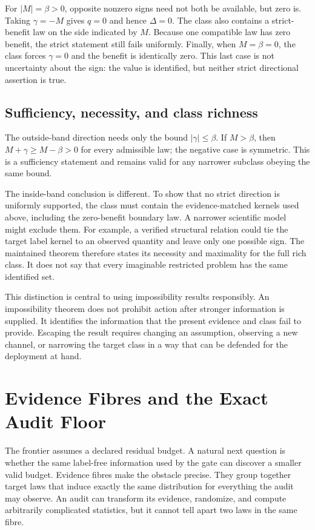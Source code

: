 For $|M|=\beta>0$, opposite nonzero signs need not both be available, but zero is.  Taking
$\gamma=-M$ gives $q=0$ and hence $\Delta=0$.  The class also contains a strict-benefit law on the
side indicated by $M$.  Because one compatible law has zero benefit, the strict statement still
fails uniformly.  Finally, when $M=\beta=0$, the class forces $\gamma=0$ and the benefit is
identically zero.  This last case is not uncertainty about the sign: the value is identified, but
neither strict directional assertion is true.

\subsection{Sufficiency, necessity, and class richness}
\label{fr:subsec-richness}

The outside-band direction needs only the bound $|\gamma|\le\beta$.  If $M>\beta$, then
$M+\gamma\ge M-\beta>0$ for every admissible law; the negative case is symmetric.  This is a
sufficiency statement and remains valid for any narrower subclass obeying the same bound.

The inside-band conclusion is different.  To show that no strict direction is uniformly supported,
the class must contain the evidence-matched kernels used above, including the zero-benefit boundary
law.  A narrower scientific model might exclude them.  For example, a verified structural relation
could tie the target label kernel to an observed quantity and leave only one possible sign.  The
maintained theorem therefore states its necessity and maximality for the full rich class.  It does
not say that every imaginable restricted problem has the same identified set.

This distinction is central to using impossibility results responsibly.  An impossibility theorem
does not prohibit action after stronger information is supplied.  It identifies the information
that the present evidence and class fail to provide.  Escaping the result requires changing an
assumption, observing a new channel, or narrowing the target class in a way that can be defended for
the deployment at hand.

\section{Evidence Fibres and the Exact Audit Floor}
\label{fr:sec-fibres}

The frontier assumes a declared residual budget.  A natural next question is whether the same
label-free information used by the gate can discover a smaller valid budget.  Evidence fibres make
the obstacle precise.  They group together target laws that induce exactly the same distribution
for everything the audit may observe.  An audit can transform its evidence, randomize, and compute
arbitrarily complicated statistics, but it cannot tell apart two laws in the same fibre.

